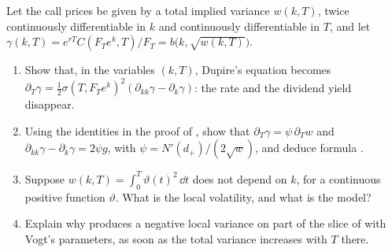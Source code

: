 \begin{exercise}\label{ex:iv-dupire-w}
\medium Let the call prices be given by a total implied variance $w(k,T)$, twice continuously
differentiable in $k$ and continuously differentiable in $T$, and let
$\gamma(k,T)=e^{rT}C(F_Te^k,T)/F_T=b\big(k,\sqrt{w(k,T)}\big)$.
\begin{enumerate}[label=(\alph*)]
  \item Show that, in the variables $(k,T)$, Dupire's equation  becomes
    $\partial_T\gamma=\frac12\sigma(T,F_Te^k)^2(\partial_{kk}\gamma-\partial_k\gamma)$: the rate and the dividend
    yield disappear.
  \item Using the identities in the proof of , show that
    $\partial_T\gamma=\psi\,\partial_Tw$ and $\partial_{kk}\gamma-\partial_k\gamma=2\psi g$, with
    $\psi=N'(d_+)/(2\sqrt w)$, and deduce formula .
  \item Suppose $w(k,T)=\int_0^T\vartheta(t)^2\,\dd t$ does not depend on $k$, for a continuous positive
    function $\vartheta$. What is the local volatility, and what is the model?
  \item Explain why  produces a negative local variance on part of the slice of
     with Vogt's parameters, as soon as the total variance increases with $T$ there.
\end{enumerate}
\end{exercise}

